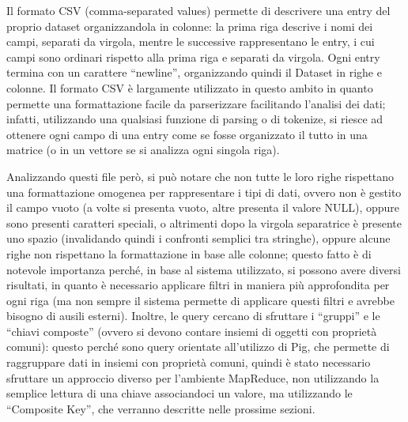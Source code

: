 \documentclass[11pt]{article} %
\begin{document}
Il formato CSV (comma-separated values) permette di descrivere una entry del proprio dataset organizzandola in colonne: la prima riga descrive i nomi dei campi, separati da virgola, mentre le successive rappresentano le entry, i cui campi sono ordinari rispetto alla prima riga e separati da virgola. Ogni entry termina con un carattere ``newline'', organizzando quindi il Dataset in righe e colonne. Il formato CSV è largamente utilizzato in questo ambito in quanto permette una formattazione facile da parserizzare facilitando l'analisi dei dati; infatti, utilizzando una qualsiasi funzione di parsing o di tokenize, si riesce ad ottenere ogni campo di una entry come se fosse organizzato il tutto in una matrice (o in un vettore se si analizza ogni singola riga).

Analizzando questi file però, si può notare che non tutte le loro righe rispettano una formattazione omogenea per rappresentare i tipi di dati, ovvero non è gestito il campo vuoto (a volte si presenta vuoto, altre presenta il valore NULL), oppure sono presenti caratteri speciali, o altrimenti dopo la virgola separatrice è presente uno spazio (invalidando quindi i confronti semplici tra stringhe), oppure alcune righe non rispettano la formattazione in base alle colonne; questo fatto è di notevole importanza perché, in base al sistema utilizzato, si possono avere diversi risultati, in quanto è necessario applicare filtri in maniera più approfondita per ogni riga (ma non sempre il sistema permette di applicare questi filtri e avrebbe bisogno di ausili esterni). Inoltre, le query cercano di sfruttare i ``gruppi'' e le ``chiavi composte'' (ovvero si devono contare insiemi di oggetti con proprietà comuni): questo perché sono query orientate all'utilizzo di Pig, che permette di raggruppare dati in insiemi con proprietà comuni, quindi è stato necessario sfruttare un approccio diverso per l'ambiente MapReduce, non utilizzando la semplice lettura di una chiave associandoci un valore, ma utilizzando le ``Composite Key'', che verranno descritte nelle prossime sezioni.
\end{document}
